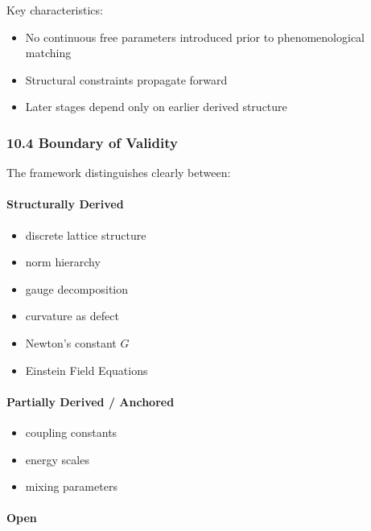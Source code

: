 \documentclass[
]{article}
\providecommand{\tightlist}{%
  \setlength{\itemsep}{0pt}\setlength{\parskip}{0pt}}
\begin{document}
Key characteristics:

\begin{itemize}
\tightlist
\item
  No continuous free parameters introduced prior to phenomenological
  matching
\item
  Structural constraints propagate forward
\item
  Later stages depend only on earlier derived structure
\end{itemize}

\hypertarget{boundary-of-validity}{%
\subsubsection{10.4 Boundary of Validity}\label{boundary-of-validity}}

The framework distinguishes clearly between:

\hypertarget{structurally-derived}{%
\paragraph{Structurally Derived}\label{structurally-derived}}

\begin{itemize}
\tightlist
\item
  discrete lattice structure
\item
  norm hierarchy
\item
  gauge decomposition
\item
  curvature as defect
\item
  Newton's constant \(G\)
\item
  Einstein Field Equations
\end{itemize}

\hypertarget{partially-derived-anchored}{%
\paragraph{Partially Derived /
Anchored}\label{partially-derived-anchored}}

\begin{itemize}
\tightlist
\item
  coupling constants
\item
  energy scales
\item
  mixing parameters
\end{itemize}

\hypertarget{open}{%
\paragraph{Open}\label{open}}
\end{document}
